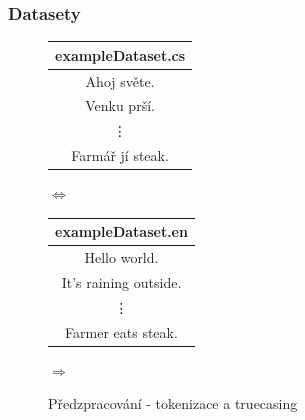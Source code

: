 \documentclass[pdf,fyma2]{beamer}
\begin{document}
\begin{frame}
\frametitle{Datasety}

        \begin{figure}[h]
            \begin{center}
                \begin{tabular}{|c|}
                  \hline
                  exampleDataset.cs\\
                  \hline
                  Ahoj světe. \\
                  Venku prší. \\
                  \vdots \\
                  Farmář jí steak. \\
                  \hline
                \end{tabular}
                $\Longleftrightarrow$
                \begin{tabular}{|c|}
                  \hline
                  exampleDataset.en\\
                  \hline
                  Hello world. \\
                  It's raining outside. \\
                  \vdots \\
                  Farmer eats steak. \\
                  \hline
                \end{tabular}
            \end{center}	
        	
        \end{figure}

        \begin{figure}[H]
            \begin{center}
             \setlength{\fboxsep}{8pt}
                $\Longrightarrow$
                \setlength{\fboxsep}{8pt}
            \end{center}
            \caption{Předzpracování - tokenizace a truecasing}
        \end{figure}


\end{frame}
\end{document}
